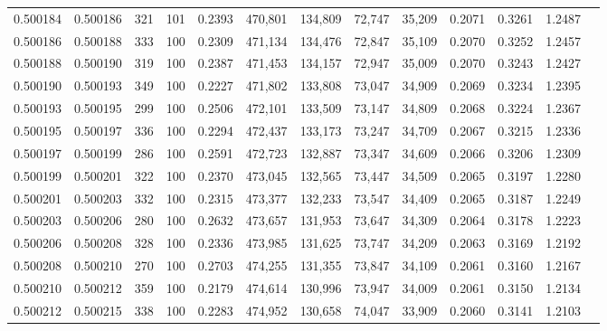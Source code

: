 \begin{tabular}{rrrrrrrrrrrrr}
0.500184 & 0.500186 &   321 & 101 &                                     0.2393 & 470,801 & 134,809 &  72,747 &  35,209 & 0.2071 & 0.3261 & 1.2487 \\
0.500186 & 0.500188 &   333 & 100 &                                     0.2309 & 471,134 & 134,476 &  72,847 &  35,109 & 0.2070 & 0.3252 & 1.2457 \\
0.500188 & 0.500190 &   319 & 100 &                                     0.2387 & 471,453 & 134,157 &  72,947 &  35,009 & 0.2070 & 0.3243 & 1.2427 \\
0.500190 & 0.500193 &   349 & 100 &                                     0.2227 & 471,802 & 133,808 &  73,047 &  34,909 & 0.2069 & 0.3234 & 1.2395 \\
0.500193 & 0.500195 &   299 & 100 &                                     0.2506 & 472,101 & 133,509 &  73,147 &  34,809 & 0.2068 & 0.3224 & 1.2367 \\
0.500195 & 0.500197 &   336 & 100 &                                     0.2294 & 472,437 & 133,173 &  73,247 &  34,709 & 0.2067 & 0.3215 & 1.2336 \\
0.500197 & 0.500199 &   286 & 100 &                                     0.2591 & 472,723 & 132,887 &  73,347 &  34,609 & 0.2066 & 0.3206 & 1.2309 \\
0.500199 & 0.500201 &   322 & 100 &                                     0.2370 & 473,045 & 132,565 &  73,447 &  34,509 & 0.2065 & 0.3197 & 1.2280 \\
0.500201 & 0.500203 &   332 & 100 &                                     0.2315 & 473,377 & 132,233 &  73,547 &  34,409 & 0.2065 & 0.3187 & 1.2249 \\
0.500203 & 0.500206 &   280 & 100 &                                     0.2632 & 473,657 & 131,953 &  73,647 &  34,309 & 0.2064 & 0.3178 & 1.2223 \\
0.500206 & 0.500208 &   328 & 100 &                                     0.2336 & 473,985 & 131,625 &  73,747 &  34,209 & 0.2063 & 0.3169 & 1.2192 \\
0.500208 & 0.500210 &   270 & 100 &                                     0.2703 & 474,255 & 131,355 &  73,847 &  34,109 & 0.2061 & 0.3160 & 1.2167 \\
0.500210 & 0.500212 &   359 & 100 &                                     0.2179 & 474,614 & 130,996 &  73,947 &  34,009 & 0.2061 & 0.3150 & 1.2134 \\
0.500212 & 0.500215 &   338 & 100 &                                     0.2283 & 474,952 & 130,658 &  74,047 &  33,909 & 0.2060 & 0.3141 & 1.2103 \\

\end{tabular}
